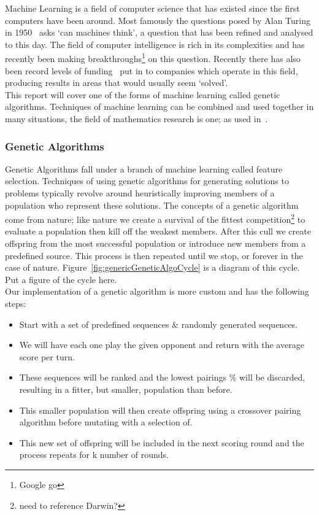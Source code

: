 Machine Learning is a field of computer science that has existed since the first computers have been around.
Most famously the questions posed by Alan Turing in 1950~\cite{turing1950computing} asks `can machines think', a question that has been refined and analysed to this day.
The field of computer intelligence is rich in its complexities and has recently been making breakthroughs\footnote{Google go} on this question.
Recently there has also been record levels of funding~\cite{chui2017artificial} put in to companies which operate in this field, producing results in areas that would usually seem `solved'.\\

This report will cover one of the forms of machine learning called genetic algorithms.
Techniques of machine learning can be combined and used together in many situations, the field of mathematics research is one;
as used in~\cite{chu1997genetic}.

\subsubsection{Genetic Algorithms}\label{subsubsec:geneticAlgorithms}
Genetic Algorithms fall under a branch of machine learning called feature selection.
Techniques of using genetic algorithms for generating solutions to problems typically revolve around heuristically improving members of a population who represent these solutions.
The concepts of a genetic algorithm come from nature;
like nature we create a survival of the fittest competition\footnote{need to reference Darwin?} to evaluate a population then kill off the weakest members.
After this cull we create offspring from the most successful population or introduce new members from a predefined source.
This process is then repeated until we stop, or forever in the case of nature.
Figure~\ref{fig:genericGeneticAlgoCycle} is a diagram of this cycle.\\

Put a figure of the cycle here.\label{fig:genericGeneticAlgoCycle} \\

Our implementation of a genetic algorithm is more custom and has the following steps:
\begin{itemize}
    \item Start with a set of predefined sequences \& randomly generated sequences.
    \item We will have each one play the given opponent and return with the average score per turn.
    \item These sequences will be ranked and the lowest pairings \% will be discarded, resulting in a fitter, but smaller, population than before.
    \item This smaller population will then create offspring using a crossover pairing algorithm before mutating with a selection of.
    \item This new set of offspring will be included in the next scoring round and the process repeats for k number of rounds.
\end{itemize}

